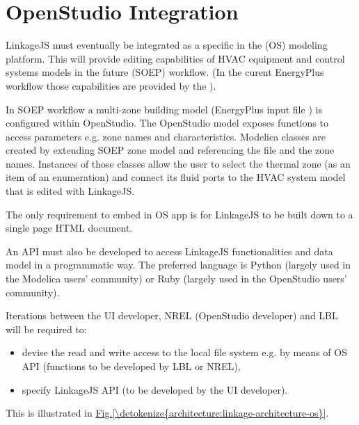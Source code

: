 \documentclass[letterpaper,10pt, openany,english]{sphinxmanual}
\begin{document}
\section{OpenStudio Integration}
\label{\detokenize{requirements:openstudio-integration}}
LinkageJS must eventually be integrated as a specific  in the  (OS) modeling platform. This will provide editing capabilities of HVAC equipment and control systems models in the future  (SOEP) workflow. (In the curent EnergyPlus workflow those capabilities are provided by the ).

In SOEP workflow a multi-zone building model (EnergyPlus input file ) is configured within OpenStudio. The OpenStudio model  exposes functions to access  parameters e.g. zone names and characteristics. Modelica classes are created by extending SOEP zone model and referencing the  file and the zone names. Instances of those classes allow the user to select the thermal zone (as an item of an enumeration) and connect its fluid ports to the HVAC system model that is edited with LinkageJS.

The only requirement to embed in OS app is for LinkageJS to be built down to a single page HTML document.

An API must also be developed to access LinkageJS functionalities and data model in a programmatic way. The preferred language is Python (largely used in the Modelica users’ community) or Ruby (largely used in the OpenStudio users’ community).

Iterations between the UI developer, NREL (OpenStudio developer) and LBL will be required to:
\begin{itemize}
\item {} 
devise the read and write access to the local file system e.g. by means of OS API (functions to be developed by LBL or NREL),

\item {} 
specify LinkageJS API (to be developed by the UI developer).

\end{itemize}

This is illustrated in \hyperref[\detokenize{architecture:linkage-architecture-os}]{Fig.\@ \ref{\detokenize{architecture:linkage-architecture-os}}}.
\end{document}
